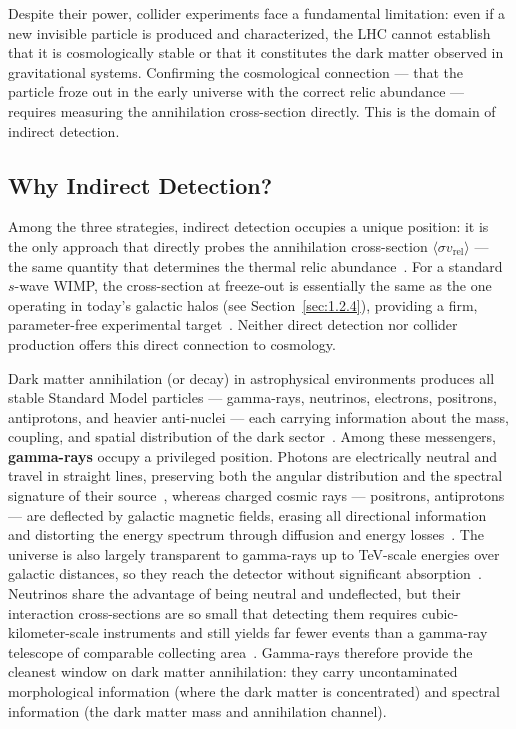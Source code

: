 Despite their power, collider experiments face a fundamental limitation: even if a new invisible particle is produced and characterized, the LHC cannot establish that it is cosmologically stable or that it constitutes the dark matter observed in gravitational systems.
Confirming the cosmological connection --- that the particle froze out in the early universe with the correct relic abundance --- requires measuring the annihilation cross-section directly.
This is the domain of indirect detection.

\subsection{Why Indirect Detection?}
\label{sec:1.3.3}

Among the three strategies, indirect detection occupies a unique position: it is the only approach that directly probes the annihilation cross-section $\langle \sigma v_\text{rel} \rangle$ --- the same quantity that determines the thermal relic abundance~\cite{Hooper:2024}.
For a standard $s$-wave WIMP, the cross-section at freeze-out is essentially the same as the one operating in today's galactic halos (see Section~\ref{sec:1.2.4}), providing a firm, parameter-free experimental target~\cite{Hooper:2024}.
Neither direct detection nor collider production offers this direct connection to cosmology.

Dark matter annihilation (or decay) in astrophysical environments produces all stable Standard Model particles --- gamma-rays, neutrinos, electrons, positrons, antiprotons, and heavier anti-nuclei --- each carrying information about the mass, coupling, and spatial distribution of the dark sector~\cite{Cirelli:2024ssz}.
Among these messengers, \textbf{gamma-rays} occupy a privileged position.
Photons are electrically neutral and travel in straight lines, preserving both the angular distribution and the spectral signature of their source~\cite{Cirelli:2024ssz,Pinetti:2021jjs}, whereas charged cosmic rays --- positrons, antiprotons --- are deflected by galactic magnetic fields, erasing all directional information and distorting the energy spectrum through diffusion and energy losses~\cite{Cirelli:2024ssz}.
The universe is also largely transparent to gamma-rays up to TeV-scale energies over galactic distances, so they reach the detector without significant absorption~\cite{Hooper:2024}.
Neutrinos share the advantage of being neutral and undeflected, but their interaction cross-sections are so small that detecting them requires cubic-kilometer-scale instruments and still yields far fewer events than a gamma-ray telescope of comparable collecting area~\cite{Cirelli:2024ssz}.
Gamma-rays therefore provide the cleanest window on dark matter annihilation: they carry uncontaminated morphological information (where the dark matter is concentrated) and spectral information (the dark matter mass and annihilation channel).

